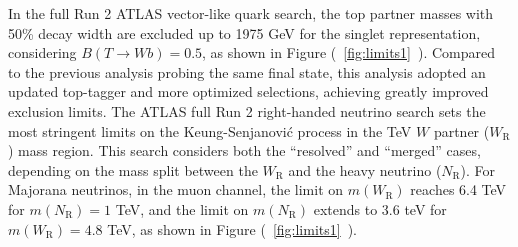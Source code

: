 \documentclass{moriond}
\begin{document}
In the full Run 2 ATLAS vector-like quark search, the top partner masses with
50\% decay width are excluded up to 1975 GeV for the singlet representation,
considering $B(T\rightarrow Wb)=0.5$, as shown in
Figure (~\ref{fig:limits1}~). Compared to the previous analysis
probing the same final state, this analysis adopted an updated top-tagger and
more optimized selections, achieving greatly improved exclusion limits. The
ATLAS full Run 2 right-handed neutrino search sets the most stringent limits on
the Keung-Senjanović process in the TeV $W$ partner ($W_{\mathrm{R}}$) mass
region. This search considers both the ``resolved'' and ``merged'' cases,
depending on the mass split between the $W_{\mathrm{R}}$ and the heavy neutrino
($N_{\mathrm{R}}$). For Majorana neutrinos, in the muon channel, the limit on
$m(W_{\mathrm{R}})$ reaches 6.4 TeV for $m(N_{\mathrm{R}})=1$ TeV, and the
limit on $m(N_{\mathrm{R}})$ extends to 3.6 teV for $m(W_{\mathrm{R}})=4.8$
TeV, as shown in Figure (~\ref{fig:limits1}~).           
\end{document}
